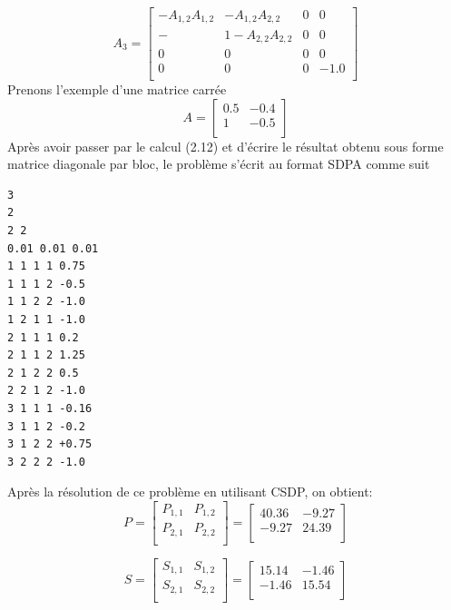 \begin{equation}
A_{3}=\left[
\begin{array}{cccc}
-A_{1,2} A_{1,2} & - A_{1,2} A_{2,2} & 0 & 0 \\
- & 1-  A_{2,2} A_{2,2} & 0 & 0 \\
0    &   0  &  0 & 0 \\
0    &   0  &  0  & -1.0 \\
\end{array}
\right]
\end{equation}
Prenons l'exemple d'une matrice carrée
 \begin{equation}
A=\left[
\begin{array}{rrrrrrr}
 0.5 & -0.4    \\ 
 1 & -0.5   \\ 
    
\end{array}
\right]
\end{equation}
Après avoir passer par le calcul (2.12) et d'écrire le résultat obtenu sous forme matrice diagonale par bloc, le problème s'écrit au format SDPA comme suit


\begin{lstlisting}
3
2
2 2
0.01 0.01 0.01
1 1 1 1 0.75
1 1 1 2 -0.5
1 1 2 2 -1.0
1 2 1 1 -1.0
2 1 1 1 0.2
2 1 1 2 1.25
2 1 2 2 0.5
2 2 1 2 -1.0
3 1 1 1 -0.16
3 1 1 2 -0.2
3 1 2 2 +0.75
3 2 2 2 -1.0
\end{lstlisting}

Après la résolution de ce problème en utilisant CSDP, on obtient:
\begin{equation}
P=\left[
\begin{array}{cc}
  P_{1,1}   & P_{1,2}\\
 P_{2,1}   & P_{2,2} \\
\end{array}
\right]
=\left[
\begin{array}{cc}
  40.36   & -9.27\\
 -9.27  & 24.39 \\
\end{array}
\right]
\end{equation}

\begin{equation}
S=\left[
\begin{array}{cc}
   S_{1,1}   &   S_{1,2}  \\
S_{2,1}    &  S_{2,2}  \\
\end{array}
\right]
=\left[
\begin{array}{cc}
15.14  & -1.46\\
-1.46   & 15.54 \\
\end{array}
\right]
\end{equation}


